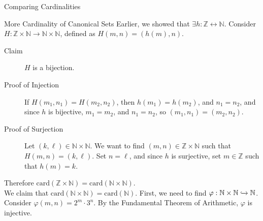 \documentclass[8pt]{extarticle}
\begin{document}
\begin{problem}{Comparing Cardinalities}
\begin{problem}{More Cardinality of Canonical Sets}
      Earlier, we showed that $\exists h: \mathbb{Z} \leftrightarrow \mathbb{N}$. Consider $H: \mathbb{Z} \times \mathbb{N} \rightarrow \mathbb{N} \times\mathbb{N}$, defined as $H(m,n) = (h(m),n)$. 
      \begin{description}
        \item[Claim] $H$ is a bijection.
        \item[Proof of Injection] If $H(m_1,n_1) = H(m_2,n_2)$, then $h(m_1) = h(m_2)$, and $n_1 = n_2$, and since $h$ is bijective, $m_1 = m_2$, and $n_1 = n_2$, so $(m_1,n_1) = (m_2,n_2)$.
        \item[Proof of Surjection] Let $(k,\ell)\in \mathbb{N} \times \mathbb{N}$. We want to find $(m,n)\in \mathbb{Z}\times \mathbb{N}$ such that $H(m,n) = (k,\ell)$. Set $n = \ell$, and since $h$ is surjective, set $m\in \mathbb{Z}$ such that $h(m) = k$.
      \end{description}
      Therefore $\text{card}(\mathbb{Z} \times \mathbb{N}) = \text{card}(\mathbb{N}\times \mathbb{N})$.\\

      We claim that $\text{card}(\mathbb{N} \times \mathbb{N}) = \text{card}(\mathbb{N})$. First, we need to find $\varphi: \mathbb{N}\times \mathbb{N} \xhookrightarrow{} \mathbb{N}$. Consider $\varphi(m,n) = 2^m\cdot 3^n$. By the Fundamental Theorem of Arithmetic, $\varphi$ is injective.\\


\end{problem}
\end{problem}
\end{document}

